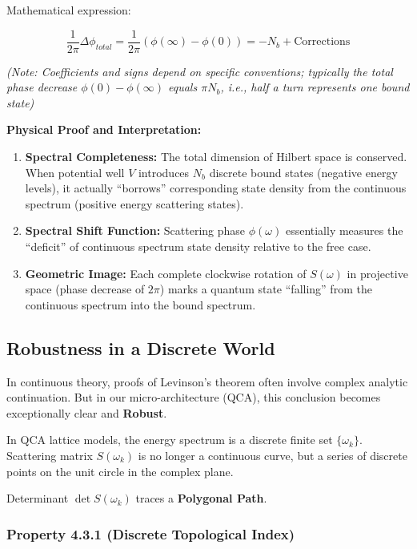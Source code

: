 Mathematical expression:

$$\frac{1}{2\pi} \Delta \phi_{total} = \frac{1}{2\pi} (\phi(\infty) - \phi(0)) = -N_b + \text{Corrections}$$

\textit{(Note: Coefficients and signs depend on specific conventions; typically the total phase decrease $\phi(0) - \phi(\infty)$ equals $\pi N_b$, i.e., half a turn represents one bound state)}

\textbf{Physical Proof and Interpretation:}

\begin{enumerate}
\item \textbf{Spectral Completeness:} The total dimension of Hilbert space is conserved. When potential well $V$ introduces $N_b$ discrete bound states (negative energy levels), it actually ``borrows'' corresponding state density from the continuous spectrum (positive energy scattering states).

\item \textbf{Spectral Shift Function:} Scattering phase $\phi(\omega)$ essentially measures the ``deficit'' of continuous spectrum state density relative to the free case.

\item \textbf{Geometric Image:} Each complete clockwise rotation of $S(\omega)$ in projective space (phase decrease of $2\pi$) marks a quantum state ``falling'' from the continuous spectrum into the bound spectrum.
\end{enumerate}

\subsection{Robustness in a Discrete World}

In continuous theory, proofs of Levinson's theorem often involve complex analytic continuation. But in our micro-architecture (QCA), this conclusion becomes exceptionally clear and \textbf{Robust}.

In QCA lattice models, the energy spectrum is a discrete finite set $\{\omega_k\}$. Scattering matrix $S(\omega_k)$ is no longer a continuous curve, but a series of discrete points on the unit circle in the complex plane.

Determinant $\det S(\omega_k)$ traces a \textbf{Polygonal Path}.

\subsubsection{Property 4.3.1 (Discrete Topological Index)}

